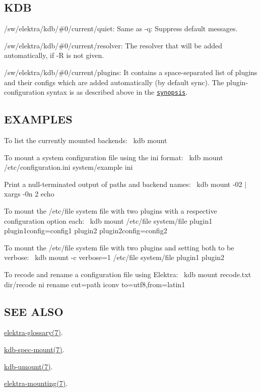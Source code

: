\subsection*{K\+DB}


\begin{DoxyItemize}
\item {\ttfamily /sw/elektra/kdb/\#0/current/quiet}\+: Same as {\ttfamily -\/q}\+: Suppress default messages.
\item {\ttfamily /sw/elektra/kdb/\#0/current/resolver}\+: The resolver that will be added automatically, if {\ttfamily -\/R} is not given.
\item {\ttfamily /sw/elektra/kdb/\#0/current/plugins}\+: It contains a space-\/separated list of plugins and their configs which are added automatically (by default sync). The plugin-\/configuration syntax is as described above in the \href{#SYNOPSIS}{\tt synopsis}.
\end{DoxyItemize}

\subsection*{E\+X\+A\+M\+P\+L\+ES}

To list the currently mounted backends\+:~\newline
 {\ttfamily kdb mount}

To mount a system configuration file using the ini format\+:~\newline
 {\ttfamily kdb mount /etc/configuration.ini system/example ini}

Print a null-\/terminated output of paths and backend names\+:~\newline
 {\ttfamily kdb mount -\/02 $\vert$ xargs -\/0n 2 echo}

To mount the /etc/file system file with two plugins with a respective configuration option each\+:~\newline
 {\ttfamily kdb mount /etc/file system/file plugin1 plugin1config=config1 plugin2 plugin2config=config2}

To mount the /etc/file system file with two plugins and setting both to be verbose\+:~\newline
 {\ttfamily kdb mount -\/c verbose=1 /etc/file system/file plugin1 plugin2}

To recode and rename a configuration file using Elektra\+:~\newline
 {\ttfamily kdb mount recode.\+txt dir/recode ni rename cut=path iconv to=utf8,from=latin1}

\subsection*{S\+EE A\+L\+SO}


\begin{DoxyItemize}
\item \hyperlink{doc_help_elektra-glossary_md}{elektra-\/glossary(7)}.
\item \hyperlink{doc_help_kdb-spec-mount_md}{kdb-\/spec-\/mount(7)}.
\item \hyperlink{doc_help_kdb-umount_md}{kdb-\/umount(7)}.
\item \hyperlink{doc_help_elektra-mounting_md}{elektra-\/mounting(7)}. 
\end{DoxyItemize}